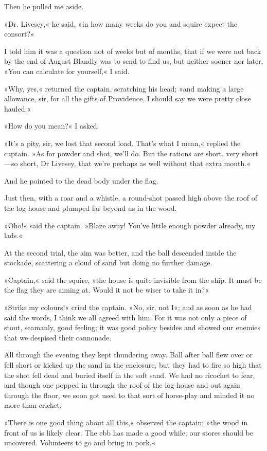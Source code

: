 Then he pulled me aside.

»Dr. Livesey,« he said, »in how many weeks do you and squire expect the consort?«

I told him it was a question not of weeks but of months, that if we were not back by the end of August Blandly was to send to find us, but neither sooner nor later. »You can calculate for yourself,« I said.

»Why, yes,« returned the captain, scratching his head; »and making a large allowance, sir, for all the gifts of Providence, I should say we were pretty close hauled.«

»How do you mean?« I asked.

»It's a pity, sir, we lost that second load. That's what I mean,« replied the captain. »As for powder and shot, we'll do. But the rations are short, very short—so short, Dr Livesey, that we're perhaps as well without that extra mouth.«

And he pointed to the dead body under the flag.

Just then, with a roar and a whistle, a round-shot passed high above the roof of the log-house and plumped far beyond us in the wood.

»Oho!« said the captain. »Blaze away! You've little enough powder already, my lads.«

At the second trial, the aim was better, and the ball descended inside the stockade, scattering a cloud of sand but doing no further damage.

»Captain,« said the squire, »the house is quite invisible from the ship. It must be the flag they are aiming at. Would it not be wiser to take it in?«

»Strike my colours!« cried the captain. »No, sir, not I«; and as soon as he had said the words, I think we all agreed with him. For it was not only a piece of stout, seamanly, good feeling; it was good policy besides and showed our enemies that we despised their cannonade.

All through the evening they kept thundering away. Ball after ball flew over or fell short or kicked up the sand in the enclosure, but they had to fire so high that the shot fell dead and buried itself in the soft sand. We had no ricochet to fear, and though one popped in through the roof of the log-house and out again through the floor, we soon got used to that sort of horse-play and minded it no more than cricket.

»There is one good thing about all this,« observed the captain; »the wood in front of us is likely clear. The ebb has made a good while; our stores should be uncovered. Volunteers to go and bring in pork.«

